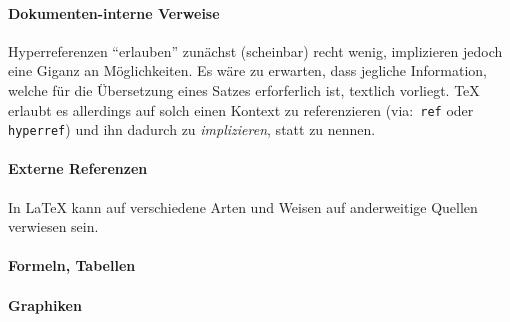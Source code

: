 %
%
%
%
\paragraph*{Dokumenten-interne Verweise}%
Hyperreferenzen \enquote{erlauben} zunächst (scheinbar) recht wenig, implizieren jedoch eine Giganz an Möglichkeiten. Es wäre zu erwarten, dass jegliche Information, welche für die Übersetzung eines Satzes erforferlich ist, textlich vorliegt. \TeX{} erlaubt es allerdings auf solch einen Kontext zu referenzieren (via:\ \texttt{ref} oder \texttt{hyperref}) und ihn dadurch zu \textit{implizieren}, statt zu nennen.


\paragraph*{Externe Referenzen}%
%
% 
%
In \LaTeX{} kann auf verschiedene Arten und Weisen auf anderweitige Quellen verwiesen sein. 


%
%
% 
%
\paragraph*{Formeln, Tabellen}



\paragraph*{Graphiken}%







